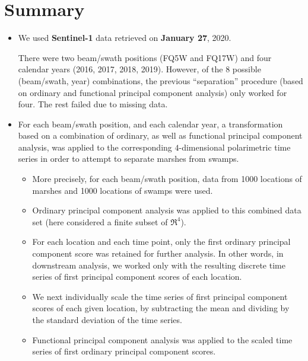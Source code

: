
\section{Summary}
\setcounter{theorem}{0}

\renewcommand{\theenumi}{\roman{enumi}}
\renewcommand{\labelenumi}{\textnormal{(\theenumi)}$\;\;$}


\begin{itemize}
\item
	We used \textbf{\color{red}Sentinel-1} data retrieved on \textbf{\color{red}January 27}, 2020.

	There were two beam/swath positions (FQ5W and FQ17W) and
	four calendar years (2016, 2017, 2018, 2019).
	However, of the $8$ possible
	(beam/swath, year) combinations, the previous ``separation'' procedure
	(based on ordinary and functional principal component analysis) only worked for
	four. The rest failed due to missing data.
\item
	For each beam/swath position, and each calendar year, a transformation
	based on a combination of ordinary, as well as functional principal component analysis,
	was applied to the corresponding $4$-dimensional polarimetric time series
	in order to attempt to separate marshes from swamps.
	\begin{itemize}
	\item
		More precisely, for each beam/swath position, data from 1000 locations of marshes 
		and 1000 locations of swamps were used.
	\item
		Ordinary principal component analysis was applied to this combined data set
		(here considered a finite subset of $\Re^{4}$).
	\item
		For each location and each time point, only the first ordinary principal component score
		was retained for further analysis.
		In other words, in downstream analysis, we worked only with the resulting
		discrete time series of first principal component scores of each location.
	\item
		We next individually scale the time series of first principal component scores
		of each given location, by subtracting the mean and dividing by the standard deviation
		of the time series.
	\item
		Functional principal component analysis was applied to the scaled time series of
		first ordinary principal component scores.

\end{itemize}
\end{itemize}

